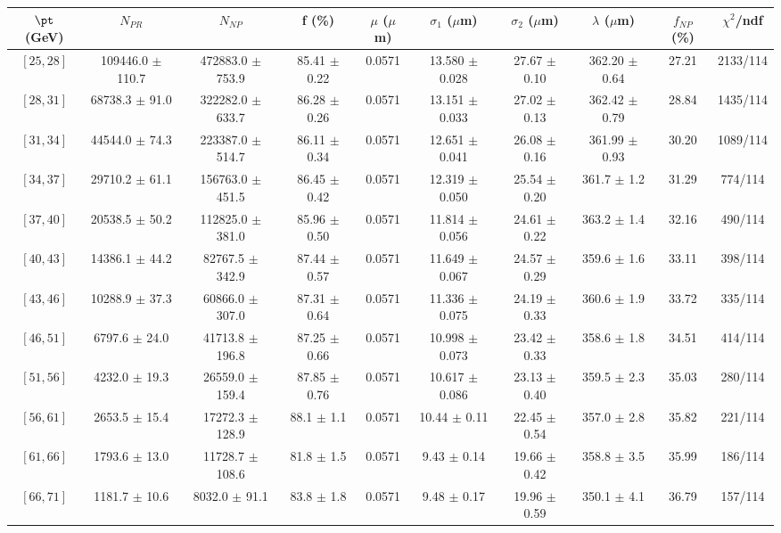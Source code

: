 \begin{tabular}{c||c|c|c|c|c|c|c||c|c}
$\pt$ (GeV) & $N_{PR}$ & $N_{NP}$ & f (\%) & $\mu$ ($\mu$m) & $\sigma_1$ ($\mu$m) & $\sigma_2$ ($\mu$m)  & $\lambda$ ($\mu$m) & $f_{NP}$ (\%) & $\chi^2$/ndf \\
\hline
$[25, 28]$ & 109446.0 $\pm$ 110.7 & 472883.0 $\pm$ 753.9 & 85.41 $\pm$ 0.22 & 0.0571 & 13.580 $\pm$ 0.028 & 27.67 $\pm$ 0.10 & 362.20 $\pm$ 0.64 & 27.21 & 2133/114\\
$[28, 31]$ & 68738.3 $\pm$ 91.0 & 322282.0 $\pm$ 633.7 & 86.28 $\pm$ 0.26 & 0.0571 & 13.151 $\pm$ 0.033 & 27.02 $\pm$ 0.13 & 362.42 $\pm$ 0.79 & 28.84 & 1435/114\\
$[31, 34]$ & 44544.0 $\pm$ 74.3 & 223387.0 $\pm$ 514.7 & 86.11 $\pm$ 0.34 & 0.0571 & 12.651 $\pm$ 0.041 & 26.08 $\pm$ 0.16 & 361.99 $\pm$ 0.93 & 30.20 & 1089/114\\
$[34, 37]$ & 29710.2 $\pm$ 61.1 & 156763.0 $\pm$ 451.5 & 86.45 $\pm$ 0.42 & 0.0571 & 12.319 $\pm$ 0.050 & 25.54 $\pm$ 0.20 & 361.7 $\pm$ 1.2 & 31.29 & 774/114\\
$[37, 40]$ & 20538.5 $\pm$ 50.2 & 112825.0 $\pm$ 381.0 & 85.96 $\pm$ 0.50 & 0.0571 & 11.814 $\pm$ 0.056 & 24.61 $\pm$ 0.22 & 363.2 $\pm$ 1.4 & 32.16 & 490/114\\
$[40, 43]$ & 14386.1 $\pm$ 44.2 & 82767.5 $\pm$ 342.9 & 87.44 $\pm$ 0.57 & 0.0571 & 11.649 $\pm$ 0.067 & 24.57 $\pm$ 0.29 & 359.6 $\pm$ 1.6 & 33.11 & 398/114\\
$[43, 46]$ & 10288.9 $\pm$ 37.3 & 60866.0 $\pm$ 307.0 & 87.31 $\pm$ 0.64 & 0.0571 & 11.336 $\pm$ 0.075 & 24.19 $\pm$ 0.33 & 360.6 $\pm$ 1.9 & 33.72 & 335/114\\
$[46, 51]$ & 6797.6 $\pm$ 24.0 & 41713.8 $\pm$ 196.8 & 87.25 $\pm$ 0.66 & 0.0571 & 10.998 $\pm$ 0.073 & 23.42 $\pm$ 0.33 & 358.6 $\pm$ 1.8 & 34.51 & 414/114\\
$[51, 56]$ & 4232.0 $\pm$ 19.3 & 26559.0 $\pm$ 159.4 & 87.85 $\pm$ 0.76 & 0.0571 & 10.617 $\pm$ 0.086 & 23.13 $\pm$ 0.40 & 359.5 $\pm$ 2.3 & 35.03 & 280/114\\
$[56, 61]$ & 2653.5 $\pm$ 15.4 & 17272.3 $\pm$ 128.9 & 88.1 $\pm$ 1.1 & 0.0571 & 10.44 $\pm$ 0.11 & 22.45 $\pm$ 0.54 & 357.0 $\pm$ 2.8 & 35.82 & 221/114\\
$[61, 66]$ & 1793.6 $\pm$ 13.0 & 11728.7 $\pm$ 108.6 & 81.8 $\pm$ 1.5 & 0.0571 & 9.43 $\pm$ 0.14 & 19.66 $\pm$ 0.42 & 358.8 $\pm$ 3.5 & 35.99 & 186/114\\
$[66, 71]$ & 1181.7 $\pm$ 10.6 & 8032.0 $\pm$ 91.1 & 83.8 $\pm$ 1.8 & 0.0571 & 9.48 $\pm$ 0.17 & 19.96 $\pm$ 0.59 & 350.1 $\pm$ 4.1 & 36.79 & 157/114\\

\end{tabular}
